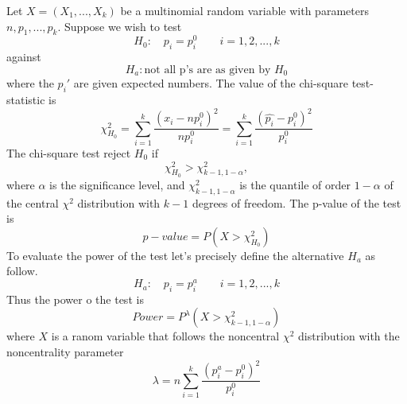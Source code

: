 \documentclass{article}
\begin{document}
Let $X=(X_1, ..., X_k)$ be a multinomial random variable with parameters
$n, p_1, ..., p_k$. Suppose we wish to test
\begin{equation}\label{goodness_of_fit_h_0}
    H_0: \quad p_i=p_{i}^0 \qquad i =1,2,...,k
\end{equation}
against
\begin{equation}
    H_a: \mbox{not all p's are as given by } H_0
\end{equation}
where the $p_{i}'$ are given expected numbers. The value of the chi-square test-statistic is
\begin{equation}
    \chi^2_{H_0} = \sum_{i=1}^k \frac{\left(x_i - np_{i}^0\right)^2}{np_{i}^0} = \sum_{i=1}^k \frac{\left(\widehat{p_i}  - p_{i}^0\right)^2}{p_{i}^0}
\end{equation}
The chi-square test reject $H_0$ if
\begin{equation}
    \chi^2_{H_0} > \chi^2_{k-1,1-\alpha},
\end{equation}
where $\alpha$ is the significance level, and $\chi^2_{k-1,1-\alpha}$ is the 
quantile of order $1-\alpha$ of the central $\chi^2$ distribution with $k-1$ degrees of
freedom.
The p-value of the test is
\begin{equation}
    p-value = P\left(X>\chi^2_{H_0}\right)
\end{equation}
To evaluate the power of the test let's precisely define the alternative $H_a$ as follow.
\begin{equation}\label{goodness_of_fit_h_a}
    H_a: \quad p_i=p_{i}^a \qquad i =1,2,...,k
\end{equation}
Thus the power o the test is
\begin{equation}
    Power = P^{\lambda}\left(X > \chi^2_{k-1,1-\alpha}\right)
\end{equation}
where $X$ is a ranom variable that follows the noncentral $\chi^2$ distribution with the noncentrality parameter
\begin{equation}\label{goodness_of_fit_lambda}
    \lambda = n \sum_{i=1}^k \frac{\left(p_{i}^a-p_{i}^0\right)^2}{p_{i}^0}
\end{equation}
\end{document}
